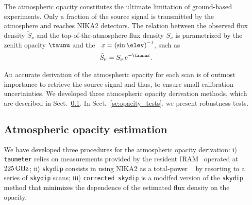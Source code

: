 
The atmospheric opacity constitutes the ultimate limitation of
ground-based experiments. Only a fraction of the source 
signal is transmitted by the atmosphere and reaches NIKA2 detectors. 
The relation between the observed flux density
$\tilde{S}_{\nu}$ and the top-of-the-atmosphere flux density $S_{\nu}$
is parametrized by the zenith opacity $\taunu$
and the \airmass\ $x = \left(\sin\elev\right)^{-1}$, such as
\begin{equation}
\tilde{S}_{\nu} = S_{\nu} \, e^{-\taunu  x}.
\label{eq:uncorr_flux}
\end{equation}

An accurate derivation of the atmospheric opacity for each scan is
of outmost importance to retrieve the source signal and thus, to
ensure small calibration uncertainties.
We developed three atmospheric opacity derivation methods, which are described in
Sect.~\ref{se:opacity_methods}. In Sect.~\ref{se:opacity_tests}, we
present robustness tests.

\subsection{Atmospheric opacity estimation}
\label{se:opacity_methods}

We have developed three procedures for the atmospheric opacity
derivation: i) {\tt taumeter} relies on measurements
provided by the resident IRAM \taumeter\ operated at $225\,\rm{GHz}$;
ii) {\tt skydip} consists in using NIKA2 as a total-power \taumeter\ 
by resorting to a series of {\tt skydip} scans;
iii) {\tt corrected skydip} is a modifed
version of the {\tt skydip} method that minimizes the dependence of the
estimated flux density on the opacity.

